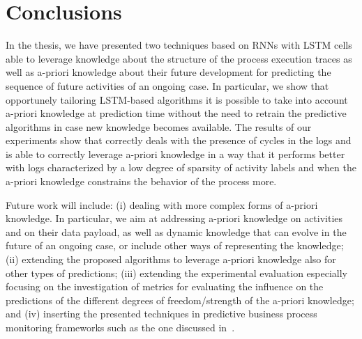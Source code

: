 
\section{Conclusions} %
\label{sec:conclusions}

In the thesis, we have presented two techniques based on RNNs with LSTM cells able to leverage knowledge about the structure of the process execution traces as well as a-priori knowledge about their future development for predicting the sequence of future activities of an ongoing case. In particular, we show that opportunely tailoring LSTM-based algorithms it is possible to take into account a-priori knowledge at prediction time without the need to retrain the predictive algorithms in case new knowledge becomes available. The results of our experiments show that \nocycle correctly deals with the presence of cycles in the logs and \protrack is able to correctly leverage a-priori knowledge in a way that it performs better with logs characterized by a low degree of sparsity of activity labels and when the a-priori knowledge constrains the behavior of the process more.

Future work will include: (i) dealing with more complex forms of a-priori knowledge. In particular, we aim at addressing a-priori knowledge on activities and on their data payload, as well as dynamic knowledge that can evolve in the future of an ongoing case, or include other ways of representing the knowledge; (ii) extending the proposed algorithms to leverage a-priori knowledge also for other types of predictions; (iii) extending the experimental evaluation especially focusing on the investigation of metrics for evaluating the influence on the predictions of the different degrees of freedom/strength of the a-priori knowledge; and (iv) inserting the presented techniques in predictive business process monitoring frameworks such as the one discussed in~\cite{Di-Francescomarino:2016aa}. 

\newpage

